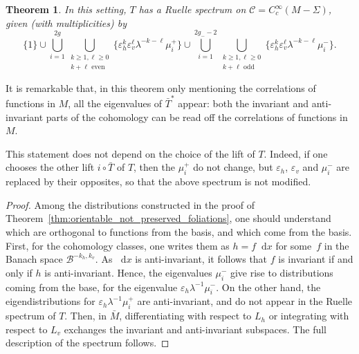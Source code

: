 \documentclass[10pt]{amsart}
\newcommand{\boC}{\mathcal{C}}
\newcommand{\boB}{\mathcal{B}}
\newcommand{\dd}{\mathop{}\!\mathrm{d}}
\let\epsilon\varepsilon
\newtheorem{thm}{Theorem}[section]
\theoremstyle{definition}
\numberwithin{equation}{section}
\begin{document}
\begin{thm}
\label{thm:ruelle_spectrum_nonorientable} In this setting, $T$ has a Ruelle
spectrum on $\boC = C^\infty_c(M-\Sigma)$, given (with multiplicities) by
\begin{equation*}
\{1\} \cup
\bigcup_{i=1}^{2g} \bigcup_{\substack{k \geq 1, \ell \geq 0\\k + \ell \text{ even}}}
\{\epsilon_h^k \epsilon_v^\ell \lambda^{-k-\ell}\mu_i^+\}
\cup
\bigcup_{i=1}^{2g_- -2} \bigcup_{\substack{k \geq 1, \ell \geq 0\\k + \ell \text{ odd}}}
\{\epsilon_h^k \epsilon_v^\ell \lambda^{-k-\ell}\mu_i^-\}.
\end{equation*}
\end{thm}
It is remarkable that, in this theorem only mentioning the correlations of
functions in $M$, all the eigenvalues of $\bar T^*$ appear: both the
invariant and anti-invariant parts of the cohomology can be read off the
correlations of functions in $M$.

This statement does not depend on the choice of the lift of $T$. Indeed, if
one chooses the other lift $i\circ \bar T$ of $T$, then the $\mu_i^+$ do not
change, but $\epsilon_h$, $\epsilon_v$ and $\mu_i^-$ are replaced by their
opposites, so that the above spectrum is not modified.
\begin{proof}
Among the distributions constructed in the proof of
Theorem~\ref{thm:orientable_not_preserved_foliations}, one should understand
which are orthogonal to functions from the basis, and which come from the
basis. First, for the cohomology classes, one writes them as $h = f \dd x$
for some~$f$ in the Banach space $\boB^{-k_h, k_v}$. As $\dd x$ is
anti-invariant, it follows that $f$ is invariant if and only if $h$ is
anti-invariant. Hence, the eigenvalues $\mu_i^-$ give rise to distributions
coming from the base, for the eigenvalue $\epsilon_h \lambda^{-1} \mu_i^-$.
On the other hand, the eigendistributions for $\epsilon_h
\lambda^{-1}\mu_i^+$ are anti-invariant, and do not appear in the Ruelle
spectrum of $T$. Then, in $\bar M$, differentiating with respect to $L_h$ or
integrating with respect to $L_v$ exchanges the invariant and anti-invariant
subspaces. The full description of the spectrum follows.
\end{proof}
\end{document}
